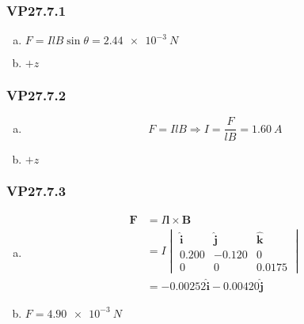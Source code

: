 \documentclass{article}
\begin{document}
\subsubsection{VP27.7.1}

\begin{enumerate}[(a)]
  \item $F = I l B \sin \theta = \qty{2.44e-3}{N}$

  \item $+z$
\end{enumerate}

\subsubsection{VP27.7.2}

\begin{enumerate}[(a)]
  \item \[F = I l B \Rightarrow I = \frac{F}{l B} = \qty{1.60}{A}\]

  \item $+z$
\end{enumerate}

\subsubsection{VP27.7.3}

\begin{enumerate}[(a)]
  \item

        \begin{align*}
          \mathbf{F} & = I \mathbf{l} \times \mathbf{B}                                                                     \\
                     & = I \begin{vmatrix}
                             \hat{\mathbf{i}} & \hat{\mathbf{j}} & \hat{\mathbf{k}} \\
                             0.200            & -0.120           & 0                \\
                             0                & 0                & 0.0175
                           \end{vmatrix} \\
                     & = -0.00252 \hat{\mathbf{i}} - 0.00420 \hat{\mathbf{j}}
        \end{align*}

  \item $F = \qty{4.90e-3}{N}$
\end{enumerate}
\end{document}
